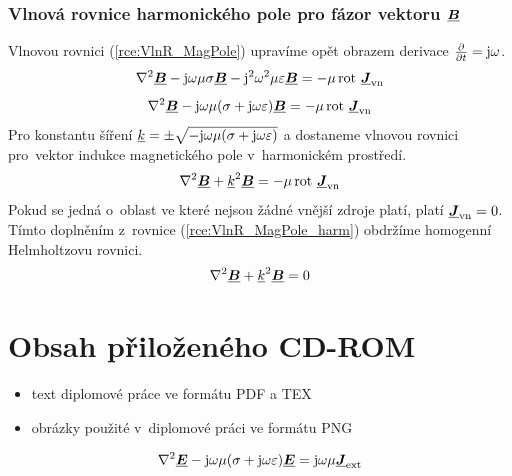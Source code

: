 \subsection*{Vlnová rovnice harmonického pole pro fázor vektoru $\mbox{\underline{\boldmath$B$}}$}
Vlnovou rovnici (\ref{rce:VlnR_MagPole}) upravíme opět obrazem derivace $\frac{\partial}{\partial t}=\mathrm{j}\omega$.
\begin{displaymath}
	\nabla^{2}\mbox{\underline{\boldmath$B$}} - \mathrm{j}\omega\mu\sigma\mbox{\underline{\boldmath$B$}} - \mathrm{j}^{2}\omega^{2}\mu\varepsilon\mbox{\underline{\boldmath$B$}} = -\mu\,\mathrm{rot}\ \mbox{\underline{\boldmath$J$}}_{\mathrm{vn}}
\end{displaymath}
\begin{displaymath}
	\nabla^{2}\mbox{\underline{\boldmath$B$}} - \mathrm{j}\omega\mu(\sigma + \mathrm{j}\omega\varepsilon)\mbox{\underline{\boldmath$B$}} = -\mu\,\mathrm{rot}\ \mbox{\underline{\boldmath$J$}}_{\mathrm{vn}}
\end{displaymath}
Pro konstantu šíření ${\underline{k}}=\pm\sqrt{-\mathrm{j}\omega\mu(\sigma+\mathrm{j}\omega\varepsilon)}$ a dostaneme vlnovou rovnici pro~vektor indukce magnetického pole v~harmonickém prostředí.
\begin{equation}
	\nabla^{2}\mbox{\underline{\boldmath$B$}} +{\underline{k}}^{2}\mbox{\underline{\boldmath$B$}} = -\mu\,\mathrm{rot}\ \mbox{\underline{\boldmath$J$}}_{\mathrm{vn}}
	\label{rce:VlnR_MagPole_harm} 
\end{equation}
Pokud se jedná o~oblast ve které nejsou žádné vnější zdroje platí, platí $\mbox{\underline{\boldmath$J$}}_{\mathrm{vn}} = 0$. Tímto doplněním z~rovnice  (\ref{rce:VlnR_MagPole_harm}) obdržíme homogenní Helmholtzovu rovnici.
\begin{equation}
	\nabla^{2}\mbox{\underline{\boldmath$B$}} +{\underline{k}}^{2}\mbox{\underline{\boldmath$B$}} = 0
	\label{rce:VlnR_MagPole_harm_BezZdroju} 
\end{equation}

\chapter{Obsah přiloženého CD-ROM} \label{kap:Obsah_CD}
\begin{itemize}
\item text diplomové práce ve formátu PDF a TEX
\item obrázky použité v~diplomové práci ve formátu PNG
\end{itemize}

\newpage
\begin{displaymath}
	\nabla^{2}\mbox{\underline{\boldmath$E$}} -\mathrm{j}\omega\mu(\sigma+\mathrm{j}\omega\varepsilon)\mbox{\underline{\boldmath$E$}} = \mathrm{j}\omega\mu\mbox{\underline{\boldmath$J$}}_{\mathrm{ext}}
\end{displaymath}